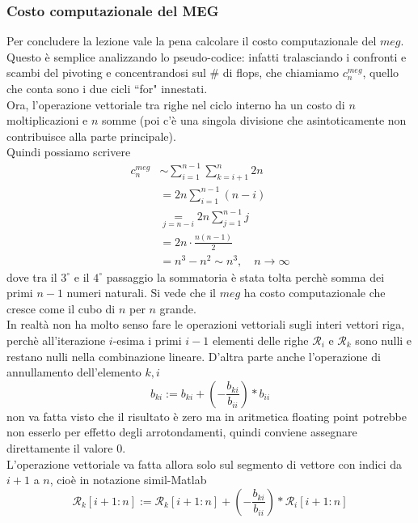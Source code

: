 \documentclass[12pt,a4paper]{article}
\begin{document}
\subsubsection{Costo computazionale del MEG}
Per concludere la lezione vale la pena calcolare il costo computazionale del $meg$.\\Questo è semplice analizzando lo pseudo-codice: infatti tralasciando i confronti e scambi del pivoting e concentrandosi sul \# di flops, che chiamiamo $c_n^{meg}$, quello che conta sono i due cicli ``for" innestati.\\Ora, l'operazione vettoriale tra righe nel ciclo interno ha un costo di $n$ moltiplicazioni e $n$ somme (poi c'è una singola divisione che asintoticamente non contribuisce alla parte principale).\\Quindi possiamo scrivere
\begin{align*}
    c_n^{meg} &\sim\sum_{i=1}^{n-1}\sum_{k=i+1}^{n}2n \\
    & = 2n\sum_{i=1}^{n-1}(n-i) \\
    &\underset{j=n-i}{=}2n\sum_{j=1}^{n-1}j \\
    & =2n\cdot\frac{n(n-1)}{2} \\
    & =n^3-n^2\sim n^3,\quad n\rightarrow\infty
\end{align*}
dove tra il $3^\circ$ e il $4^\circ$ passaggio la sommatoria è stata tolta perchè somma dei primi $n-1$ numeri naturali. Si vede che il $meg$ ha costo computazionale che cresce come il cubo di $n$ per $n$ grande.\\In realtà non ha molto senso fare le operazioni vettoriali sugli interi vettori riga, perchè all'iterazione $i$-esima i primi $i-1$ elementi delle righe $\mathcal{R}_i$ e $\mathcal{R}_k$ sono nulli e restano nulli nella combinazione lineare. D'altra parte anche l'operazione di annullamento dell'elemento $k,i$
\begin{equation*}
    b_{ki}:=b_{ki}+\left(-\frac{b_{ki}}{b_{ii}}\right)\ast b_{ii}
\end{equation*}
non va fatta visto che il risultato è zero ma in aritmetica floating point potrebbe non esserlo per effetto degli arrotondamenti, quindi conviene assegnare direttamente il valore 0.\\L'operazione vettoriale va fatta allora solo sul segmento di vettore con indici da $i+1$ a $n$, cioè in notazione simil-Matlab
\begin{equation*}
    \mathcal{R}_k[i+1:n]:=\mathcal{R}_k[i+1:n]+\left(-\frac{b_{ki}}{b_{ii}}\right)\ast \mathcal{R}_i[i+1:n]
\end{equation*}
\end{document}
